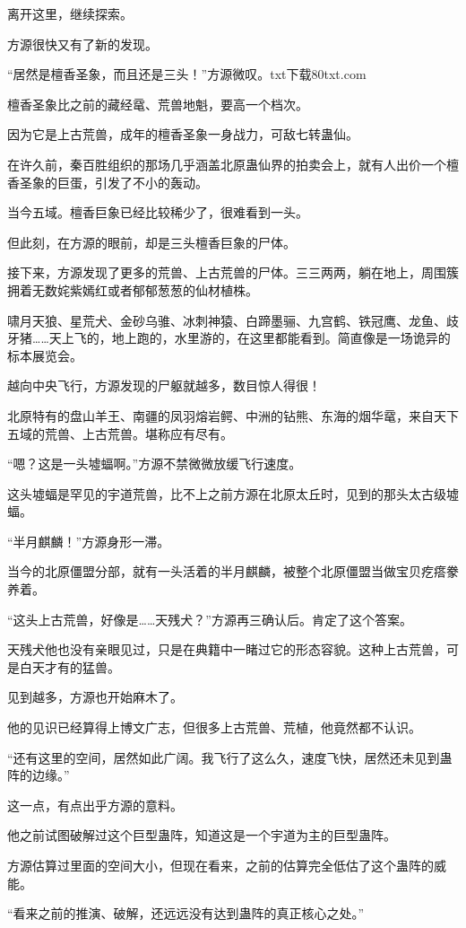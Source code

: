 \begin{this_body}
离开这里，继续探索。

方源很快又有了新的发现。

“居然是檀香圣象，而且还是三头！”方源微叹。txt下载80txt.com

檀香圣象比之前的藏经鼋、荒兽地魁，要高一个档次。

因为它是上古荒兽，成年的檀香圣象一身战力，可敌七转蛊仙。

在许久前，秦百胜组织的那场几乎涵盖北原蛊仙界的拍卖会上，就有人出价一个檀香圣象的巨蛋，引发了不小的轰动。

当今五域。檀香巨象已经比较稀少了，很难看到一头。

但此刻，在方源的眼前，却是三头檀香巨象的尸体。

接下来，方源发现了更多的荒兽、上古荒兽的尸体。三三两两，躺在地上，周围簇拥着无数姹紫嫣红或者郁郁葱葱的仙材植株。

啸月天狼、星荒犬、金砂乌骓、冰刺神猿、白蹄墨骊、九宫鹤、铁冠鹰、龙鱼、歧牙猪……天上飞的，地上跑的，水里游的，在这里都能看到。简直像是一场诡异的标本展览会。

越向中央飞行，方源发现的尸躯就越多，数目惊人得很！

北原特有的盘山羊王、南疆的凤羽熔岩鳄、中洲的钻熊、东海的烟华鼋，来自天下五域的荒兽、上古荒兽。堪称应有尽有。

“嗯？这是一头墟蝠啊。”方源不禁微微放缓飞行速度。

这头墟蝠是罕见的宇道荒兽，比不上之前方源在北原太丘时，见到的那头太古级墟蝠。

“半月麒麟！”方源身形一滞。

当今的北原僵盟分部，就有一头活着的半月麒麟，被整个北原僵盟当做宝贝疙瘩豢养着。

“这头上古荒兽，好像是……天残犬？”方源再三确认后。肯定了这个答案。

天残犬他也没有亲眼见过，只是在典籍中一睹过它的形态容貌。这种上古荒兽，可是白天才有的猛兽。

见到越多，方源也开始麻木了。

他的见识已经算得上博文广志，但很多上古荒兽、荒植，他竟然都不认识。

“还有这里的空间，居然如此广阔。我飞行了这么久，速度飞快，居然还未见到蛊阵的边缘。”

这一点，有点出乎方源的意料。

他之前试图破解过这个巨型蛊阵，知道这是一个宇道为主的巨型蛊阵。

方源估算过里面的空间大小，但现在看来，之前的估算完全低估了这个蛊阵的威能。

“看来之前的推演、破解，还远远没有达到蛊阵的真正核心之处。”


\end{this_body}
